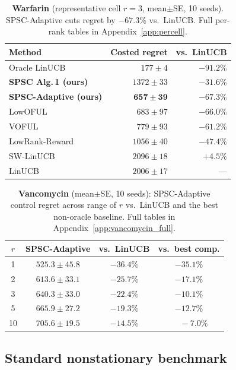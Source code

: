 \documentclass{article}
\begin{document}
\begin{table}[t]
\centering
\caption{\textbf{Warfarin} (representative cell $r{=}3$, mean$\pm$SE,
10 seeds). SPSC-Adaptive cuts regret by $-67.3\%$ vs.\ LinUCB. Full
per-rank tables in Appendix~\ref{app:percell}.}
\label{tab:warfarin_body}
\small
\begin{tabular}{lrr}
\toprule
Method & Costed regret & vs.\ LinUCB \\
\midrule
Oracle LinUCB                  & $177\pm 4$   & $-91.2\%$\\
\textbf{SPSC Alg.\,1 (ours)}   & $1372\pm 33$ & $-31.6\%$\\
\textbf{SPSC-Adaptive (ours)}  & $\mathbf{657\pm 39}$ & $\mathbf{-67.3\%}$\\
LowOFUL                        & $683\pm 97$  & $-66.0\%$\\
VOFUL                          & $779\pm 93$  & $-61.2\%$\\
LowRank-Reward                 & $1056\pm 40$ & $-47.4\%$\\
SW-LinUCB                      & $2096\pm 18$ & $+4.5\%$\\
LinUCB                         & $2006\pm 17$ & ---\\
\bottomrule
\end{tabular}
\end{table}

\begin{table}[!htbp]
\centering
\caption{\textbf{Vancomycin} (mean$\pm$SE, 10 seeds): SPSC-Adaptive
control regret across range of $r$ vs.\ LinUCB and the best
non-oracle baseline. Full tables in
Appendix~\ref{app:vancomycin_full}.}
\label{tab:vancomycin_body}
\small
\setlength{\tabcolsep}{6pt}
\begin{tabular}{cccc}
\toprule
$r$ & SPSC-Adaptive  & vs.\ LinUCB & vs.\ best comp.\\
\midrule
1   & $\mathbf{525.3\pm 45.8}$ & $-36.4\%$ & $-35.1\%$ \\
2   & $\mathbf{613.6\pm 33.1}$ & $-25.7\%$ & $-17.1\%$ \\
3   & $\mathbf{640.3\pm 33.0}$ & $-22.4\%$ & $-10.1\%$ \\
5   & $\mathbf{665.9\pm 27.2}$ & $-19.3\%$ & $-12.7\%$ \\
10  & $\mathbf{705.6\pm 19.5}$ & $-14.5\%$ & $\phantom{-}-7.0\%$ \\
\bottomrule
\end{tabular}
\end{table}

\subsection{Standard nonstationary benchmark}
\label{sec:exp_russac}
\end{document}
